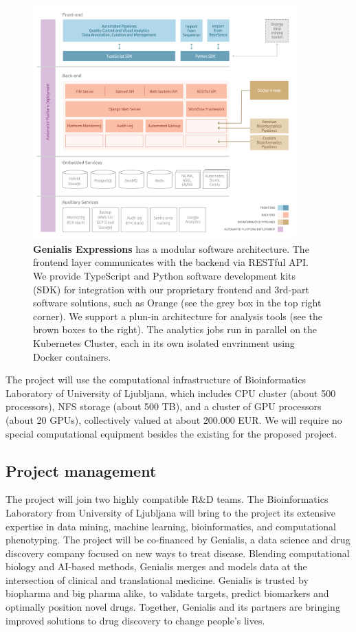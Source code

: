 \documentclass[11pt,a4paper]{article}
\renewcommand{\bold}{\textbf}
\begin{document}
\begin{figure}
\includegraphics[width=0.90\textwidth]{genialis-expressions-software-components}
\caption{\bold{Genialis Expressions} has a modular software architecture. The frontend layer communicates with the backend via RESTful API. We provide TypeScript and Python software development kits (SDK) for integration with our proprietary frontend and 3rd-part software solutions, such as Orange (see the grey box in the top right corner). We support a plun-in architecture for analysis tools (see the brown boxes to the right). The analytics jobs run in parallel on the Kubernetes Cluster, each in its own isolated envrinment using Docker containers.}
\label{fig:genialis-expressions-software-components}
\end{figure}

The project will use the computational infrastructure of Bioinformatics Laboratory of University of Ljubljana, which includes CPU cluster (about 500 processors), NFS storage (about 500 TB), and a cluster of GPU processors (about 20 GPUs), collectively valued at about 200.000 EUR. We will require no special computational equipment besides the existing for the proposed project.

\subsection{Project management}

The project will join two highly compatible R\&D teams. The Bioinformatics Laboratory from University of Ljubljana will bring to the project its extensive expertise in data mining, machine learning, bioinformatics, and computational phenotyping. The project will be co-financed by Genialis, a data science and drug discovery company focused on new ways to treat disease. Blending computational biology and AI-based methods, Genialis merges and models data at the intersection of clinical and translational medicine. Genialis is trusted by biopharma and big pharma alike, to validate targets, predict biomarkers and optimally position novel drugs. Together, Genialis and its partners are bringing improved solutions to drug discovery to change people's lives.
\end{document}
